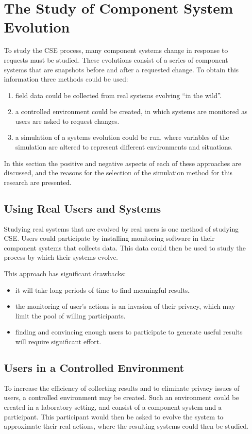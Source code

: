 \section{The Study of Component System Evolution}
To study the CSE process, many component systems change in response to requests must be studied.
These evolutions consist of a series of component systems that are snapshots before and after a requested change.
To obtain this information three methods could be used:
\begin{enumerate}
  \item field data could be collected from real systems evolving ``in the wild''.
  \item a controlled environment could be created, in which systems are monitored as users are asked to request changes.
  \item a simulation of a systems evolution could be run, where variables of the simulation are altered to represent different environments and situations.
\end{enumerate} 

In this section the positive and negative aspects of each of these approaches are discussed,
and the reasons for the selection of the simulation method for this research are presented.

\subsection{Using Real Users and Systems}
Studying real systems that are evolved by real users is one method of studying CSE.
Users could participate by installing monitoring software in their component systems that collects data.
This data could then be used to study the process by which their systems evolve.

This approach  has significant drawbacks:
\begin{itemize}
  \item it will take long periods of time to find meaningful results.
  \item the monitoring of user's actions is an invasion of their privacy, which may limit the pool of willing participants.
  \item finding and convincing enough users to participate to generate useful results will require significant effort.
\end{itemize}

\subsection{Users in a Controlled Environment}
To increase the efficiency of collecting results and to eliminate privacy issues of users, a controlled environment may be created.
Such an environment could be created in a laboratory setting, and consist of a component system and a participant.
This participant would then be asked to evolve the system to approximate their real actions, where the resulting systems could then be studied.

